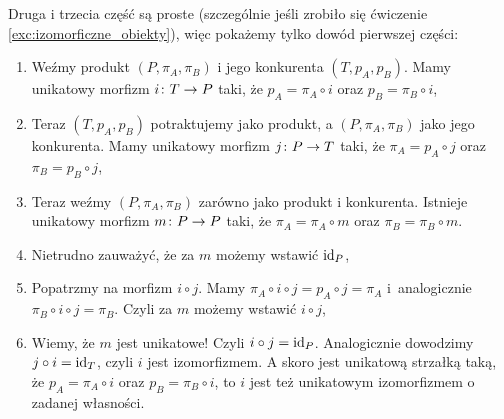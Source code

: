 \begin{prof}
  Druga i trzecia część są proste (szczególnie jeśli zrobiło się ćwiczenie \ref{exc:izomorficzne_obiekty}), więc pokażemy tylko dowód pierwszej części:
  \begin{enumerate}
    \item Weźmy produkt $(P, \pi_A, \pi_B)$ i jego konkurenta $(T, p_A, p_B)$. Mamy unikatowy morfizm $i\colon T\to P$ taki, że $p_A = \pi_A\circ i$ oraz $p_B = \pi_B\circ i$,
    \begin{center}
    \end{center}
    \item Teraz $(T, p_A, p_B)$ potraktujemy jako produkt, a $(P, \pi_A, \pi_B)$ jako jego konkurenta. Mamy unikatowy morfizm $j\colon P\to T$ taki, że $\pi_A = p_A\circ j$ oraz $\pi_B = p_B\circ j$,
    \begin{center}
    \end{center}
    \item Teraz weźmy $(P, \pi_A, \pi_B)$ zarówno jako produkt i konkurenta. Istnieje unikatowy morfizm $m\colon P\to P$ taki, że $\pi_A = \pi_A\circ m$ oraz $\pi_B=\pi_B\circ m$.
    \begin{center}
    \end{center}
    \item Nietrudno zauważyć, że za $m$ możemy wstawić $\mathrm{id}_{P}$,
    \item Popatrzmy na morfizm $i\circ j$. Mamy $\pi_A \circ i\circ j = p_A\circ j = \pi_A$ i~analogicznie $\pi_B\circ i\circ j = \pi_B$. Czyli za $m$ możemy wstawić $i\circ j$,
    \item Wiemy, że $m$ jest unikatowe! Czyli $i\circ j = \mathrm{id}_{P}$. Analogicznie dowodzimy $j\circ i=\mathrm{id}_{T}$, czyli $i$ jest izomorfizmem. A skoro jest unikatową strzałką taką, że $p_A=\pi_A\circ i$ oraz $p_B=\pi_B\circ i$, to $i$ jest też unikatowym izomorfizmem o zadanej własności.
  \end{enumerate}
\end{prof}

